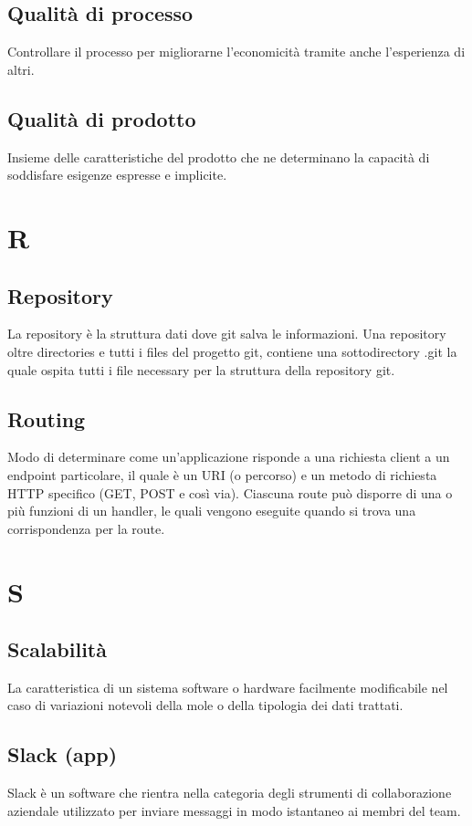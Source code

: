 {	\subsection{Qualità di processo}
	Controllare il processo per migliorarne l'economicità tramite anche l'esperienza di altri.
	
	\subsection{Qualità di prodotto}
	Insieme delle caratteristiche del prodotto che ne determinano la capacità di soddisfare esigenze espresse e implicite.
	
	
	\section{R}
	\subsection{Repository} 
	La repository è la struttura dati dove git salva le informazioni. Una repository oltre directories e tutti i files del progetto git, contiene una sottodirectory .git la quale ospita tutti i file necessary per la struttura della repository git.
	
	\subsection{Routing} 
	Modo di determinare come un’applicazione risponde a una richiesta client a un endpoint particolare, il quale è un URI (o percorso) e un metodo di richiesta HTTP specifico (GET, POST e così via). Ciascuna route può disporre di una o più funzioni di un handler, le quali vengono eseguite quando si trova una corrispondenza per la route.
	
	\section{S}
	\subsection{Scalabilità}
	La caratteristica di un sistema software o hardware facilmente modificabile nel caso di variazioni notevoli della mole o della tipologia dei dati trattati.
	
	\subsection{Slack (app)} 
	Slack è un software che rientra nella categoria degli strumenti di collaborazione aziendale utilizzato per inviare messaggi in modo istantaneo ai membri del team.
	
}
